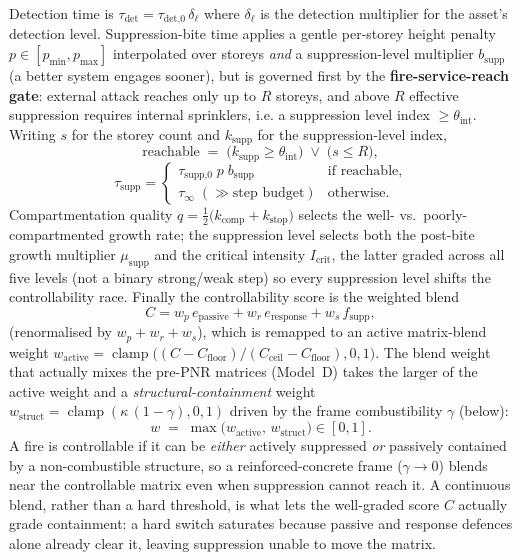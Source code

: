 \documentclass[11pt,a4paper]{article}
\begin{document}
Detection time is $\tau_{\text{det}} = \tau_{\text{det,0}}\,\delta_{\ell}$ where
$\delta_\ell$ is the detection multiplier for the asset's detection level.
Suppression-bite time applies a gentle per-storey height penalty
$p \in [p_{\min},p_{\max}]$ interpolated over storeys \emph{and} a
suppression-level multiplier $b_{\text{supp}}$ (a better system engages sooner),
but is governed first by the \textbf{fire-service-reach gate}: external attack
reaches only up to $R$ storeys, and above $R$ effective suppression requires
internal sprinklers, i.e. a suppression level index $\ge \theta_{\text{int}}$.
Writing $s$ for the storey count and $k_{\text{supp}}$ for the suppression-level
index,
\[
\text{reachable} \;=\; \big(k_{\text{supp}} \ge \theta_{\text{int}}\big)
                       \;\lor\; \big(s \le R\big),
\]
\[
\tau_{\text{supp}} =
\begin{cases}
\tau_{\text{supp,0}}\; p \; b_{\text{supp}} & \text{if reachable},\\[2pt]
\tau_{\infty} \;(\gg \text{step budget}) & \text{otherwise.}
\end{cases}
\]
Compartmentation quality
$q = \tfrac12\big(k_{\text{comp}}+k_{\text{stop}}\big)$ selects the
well- vs.\ poorly-compartmented growth rate; the suppression level selects both
the post-bite growth multiplier $\mu_{\text{supp}}$ and the critical intensity
$I_{\text{crit}}$, the latter graded across all five levels (not a binary
strong/weak step) so every suppression level shifts the controllability race.
Finally the controllability score is the weighted blend
\[
C = w_p\,e_{\text{passive}} + w_r\,e_{\text{response}}
    + w_s\,f_{\text{supp}},
\]
(renormalised by $w_p+w_r+w_s$), which is remapped to an active matrix-blend
weight $w_{\text{active}} = \operatorname{clamp}\big((C - C_{\text{floor}})/
(C_{\text{ceil}} - C_{\text{floor}}),0,1\big)$. The blend weight that actually
mixes the pre-PNR matrices (Model~D) takes the larger of the active weight and a
\emph{structural-containment} weight $w_{\text{struct}} = \operatorname{clamp}
(\kappa\,(1-\gamma),0,1)$ driven by the frame combustibility $\gamma$ (below):
\[
w \;=\; \max\!\big(w_{\text{active}},\, w_{\text{struct}}\big) \in [0,1].
\]
A fire is controllable if it can be \emph{either} actively suppressed
\emph{or} passively contained by a non-combustible structure, so a
reinforced-concrete frame ($\gamma\!\to\!0$) blends near the controllable matrix
even when suppression cannot reach it. A continuous blend, rather than a hard
threshold, is what lets the well-graded score $C$ actually grade containment: a
hard switch saturates because passive and response defences alone already clear
it, leaving suppression unable to move the matrix.
\end{document}
